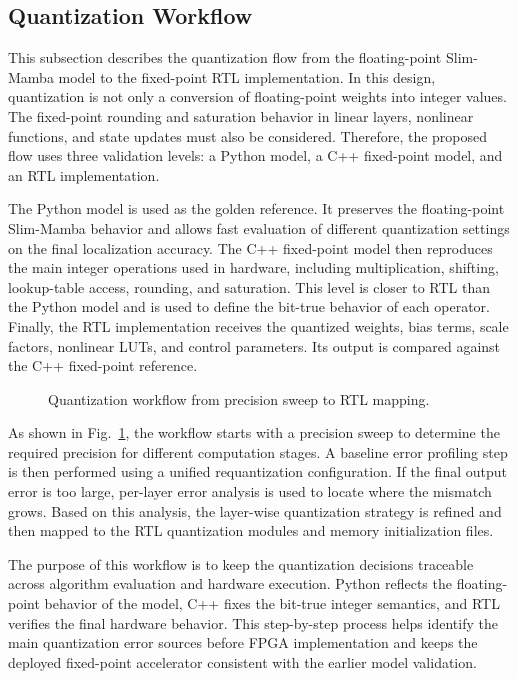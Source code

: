 \documentclass[11pt,twoside]{eitExjobb}
\begin{document}
\subsection{Quantization Workflow}
\label{subsec:quant_workflow}

This subsection describes the quantization flow from the floating-point Slim-Mamba
model to the fixed-point RTL implementation. In this design, quantization is not only a
conversion of floating-point weights into integer values. The fixed-point rounding and
saturation behavior in linear layers, nonlinear functions, and state updates must also be 
considered. Therefore, the proposed flow uses
three validation levels: a Python model, a C++ fixed-point model, and an RTL
implementation.

The Python model is used as the golden reference. It preserves the floating-point
Slim-Mamba behavior and allows fast evaluation of different quantization settings on
the final localization accuracy. The C++ fixed-point model then reproduces the main
integer operations used in hardware, including multiplication, shifting, lookup-table
access, rounding, and saturation. This level is closer to RTL than the Python model and
is used to define the bit-true behavior of each operator. Finally, the RTL
implementation receives the quantized weights, bias terms, scale factors, nonlinear LUTs,
and control parameters. Its output is compared against the C++ fixed-point reference.

\begin{figure}[H]
  \centering
  
  \caption{Quantization workflow from precision sweep to RTL mapping.}
  \label{fig:quantization_workflow}
\end{figure}

As shown in Fig.~\ref{fig:quantization_workflow}, the workflow starts with a precision
sweep to determine the required precision for different computation stages. A baseline
error profiling step is then performed using a unified requantization
configuration. If the final output error is
too large, per-layer error analysis is used to locate where the mismatch grows. Based on
this analysis, the layer-wise quantization strategy is refined and then mapped to the
RTL quantization modules and memory initialization files.

The purpose of this workflow is to keep the quantization decisions traceable across
algorithm evaluation and hardware execution. Python reflects the floating-point behavior 
of the model, C++ fixes the bit-true integer semantics, and RTL verifies the final
hardware behavior. This step-by-step process helps identify the main quantization error
sources before FPGA implementation and keeps the deployed fixed-point accelerator
consistent with the earlier model validation.
\end{document}
